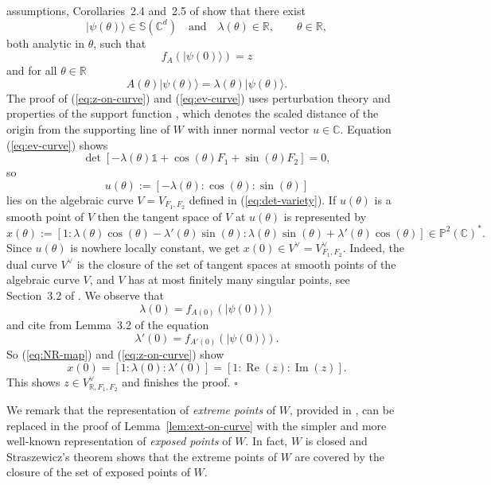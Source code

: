 \documentclass[12pt]{amsart}
\theoremstyle{definition}
\numberwithin{equation}{section}
\begin{document}
assumptions, Corollaries~2.4 and~2.5 of \cite{SpitkovskyWeis2016} show that 
there exist 
\[
|\psi(\theta)\rangle\in{\mathbb S}({\mathbb C}^d)
\quad\mbox{and}\quad
\lambda(\theta)\in{\mathbb R},
\qquad\theta\in{\mathbb R},
\]
both analytic in $\theta$, such that 
\begin{equation}\label{eq:z-on-curve}
f_A(|\psi(0)\rangle)=z
\end{equation} 
and for all $\theta\in{\mathbb R}$
\begin{equation}\label{eq:ev-curve}
A(\theta)|\psi(\theta)\rangle=\lambda(\theta)|\psi(\theta)\rangle.
\end{equation} 
The proof of (\ref{eq:z-on-curve}) and (\ref{eq:ev-curve}) uses perturbation 
theory \cite{Rellich1954} and properties of the support function 
\cite{Schneider2014}, which denotes the scaled distance of the origin from 
the supporting line of $W$ with inner normal vector $u\in{\mathbb C}$. Equation 
(\ref{eq:ev-curve}) shows
\[
\det[-\lambda(\theta){\mathds{1}}+\cos(\theta)F_1+\sin(\theta)F_2]=0,
\]
so 
\[
u(\theta):=[-\lambda(\theta):\cos(\theta):\sin(\theta)]
\]
lies on the algebraic curve $V=V_{F_1,F_2}$ defined in (\ref{eq:det-variety}).
If $u(\theta)$ is a smooth point of $V$ then the tangent space of $V$ at 
$u(\theta)$ is represented by
\[
x(\theta):=[1:\lambda(\theta)\cos(\theta)-\lambda'(\theta)\sin(\theta):
\lambda(\theta)\sin(\theta)+\lambda'(\theta)\cos(\theta)]\in
{\mathbb P}^2({\mathbb C})^*.
\]
Since $u(\theta)$ is nowhere locally constant, we get 
$x(0)\in V^\vee=V^\vee_{F_1,F_2}$. Indeed, the dual curve $V^\vee$ is the 
closure of the set of tangent spaces at smooth points of the algebraic curve 
$V$, and $V$ has at most finitely many singular points, see 
Section~3.2 of \cite{Fischer2001}. We observe that
\[
\lambda(0)=f_{A(0)}(|\psi(0)\rangle)
\]
and cite from Lemma~3.2 of \cite{JoswigStraub1998} the equation
\[
\lambda'(0)=f_{A'(0)}(|\psi(0)\rangle).
\]
So (\ref{eq:NR-map}) and (\ref{eq:z-on-curve}) show 
\[
x(0)
=[1:\lambda(0):\lambda'(0)]
=[1:{\operatorname{Re}}(z):{\operatorname{Im}}(z)].
\]
This shows $z\in V^\vee_{{\mathbb R},F_1,F_2}$ and finishes the proof.
\hspace*{\fill}$\square$\\
\par
We remark that the representation of {\em extreme points} of $W$, 
provided in \cite{SpitkovskyWeis2016}, can be replaced in the proof of 
Lemma~\ref{lem:ext-on-curve} with the simpler and more well-known 
representation of {\em exposed points} of $W$. In fact, $W$ is closed
and Straszewicz's theorem \cite{Schneider2014} shows that the extreme 
points of $W$ are covered by the closure of the set of exposed points 
of $W$.
\end{document}
